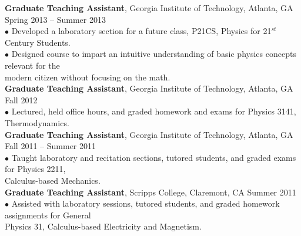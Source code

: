 \documentclass[10pt]{article}
\begin{document}
{\bf Graduate Teaching Assistant}, Georgia Institute of Technology, Atlanta, GA \hfill Spring 2013 -- Summer 2013\\
\hspace*{10pt}$\bullet$ Developed a laboratory section for a future class, P21CS, Physics for 21$^{st}$ Century Students. \\
\hspace*{10pt}$\bullet$ Designed course to impart an intuitive understanding of basic physics concepts relevant for the \\ \hspace*{15pt} modern citizen without focusing on the math. \\

{\bf Graduate Teaching Assistant}, Georgia Institute of Technology, Atlanta, GA \hfill Fall 2012 \\
\hspace*{10pt}$\bullet$ Lectured, held office hours, and graded homework and exams for Physics 3141, Thermodynamics. \\


{\bf Graduate Teaching Assistant}, Georgia Institute of Technology, Atlanta, GA \hfill Fall 2011 -- Summer 2011\\
\hspace*{10pt}$\bullet$ Taught laboratory and recitation sections, tutored students, and graded exams for Physics 2211, \\ \hspace*{15pt} Calculus-based Mechanics. \\


{\bf  Graduate Teaching Assistant}, Scripps College, Claremont, CA \hfill Summer 2011\\
\hspace*{10pt}$\bullet$ Assisted with laboratory sessions, tutored students, and graded homework assignments for General\\ \hspace*{15pt} Physics 31, Calculus-based Electricity and Magnetism. \\


%
%
%
%
\end{document}
